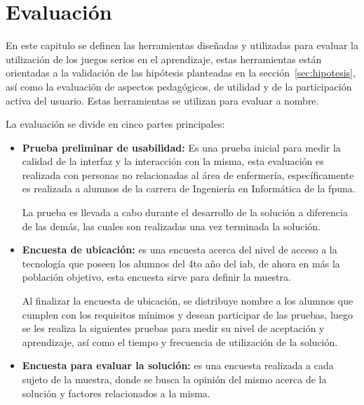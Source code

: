 
\chapter{Evaluación}
\label{chap:evaluacion}

En este capitulo se definen las herramientas diseñadas y utilizadas para evaluar
la utilización de los juegos serios en el aprendizaje, estas herramientas están
orientadas a la validación de las hipótesis planteadas en la
sección~\ref{sec:hipotesis}, así como la evaluación de aspectos pedagógicos, de
utilidad y de la participación activa del usuario. Estas herramientas se
utilizan para evaluar a \gls{nombre}.

La evaluación se divide en cinco partes principales:

\begin{itemize}

    \item \textbf{Prueba preliminar de usabilidad:} Es una prueba inicial para
        medir la calidad de la interfaz y la interacción con la misma, esta
        evaluación es realizada con personas no relacionadas al área de
        enfermería, específicamente es realizada a alumnos de la carrera de
        Ingeniería en Informática de la \gls{fpuna}.

        La prueba es llevada a cabo durante el desarrollo de la solución a
        diferencia de las demás, las cuales son realizadas una vez terminada la
        solución.

    \item \textbf{Encuesta de ubicación:} es una encuesta acerca del nivel de
        acceso a la tecnología que poseen los alumnos del 4to año del \Gls{iab},
        de ahora en más la población objetivo, esta encuesta sirve para definir
        la muestra.

        Al finalizar la encuesta de ubicación, se distribuye \gls{nombre} a los
        alumnos que cumplen con los requisitos mínimos y desean participar de
        las pruebas, luego se les realiza la siguientes pruebas para medir su
        nivel de aceptación y aprendizaje, así como el tiempo y frecuencia de
        utilización de la solución.

    \item \textbf{Encuesta para evaluar la solución:} es una encuesta realizada
        a cada sujeto de la muestra, donde se busca la opinión del mismo acerca
        de la solución y factores relacionados a la misma. 


\end{itemize}
